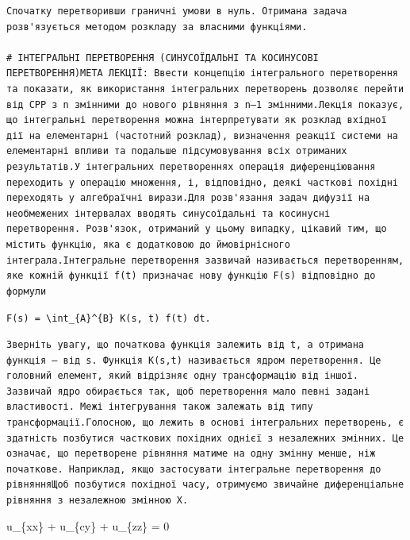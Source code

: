\documentclass[
  ukrainian,
]{article}
\begin{document}
\begin{verbatim}
Спочатку перетворивши граничні умови в нуль. Отримана задача розв'язується методом розкладу за власними функціями.

# ІНТЕГРАЛЬНІ ПЕРЕТВОРЕННЯ (СИНУСОЇДАЛЬНІ ТА КОСИНУСОВІ ПЕРЕТВОРЕННЯ)МЕТА ЛЕКЦІЇ: Ввести концепцію інтегрального перетворення та показати, як використання інтегральних перетворень дозволяє перейти від CPP з n змінними до нового рівняння з n—1 змінними.Лекція показує, що інтегральні перетворення можна інтерпретувати як розклад вхідної дії на елементарні (частотний розклад), визначення реакції системи на елементарні впливи та подальше підсумовування всіх отриманих результатів.У інтегральних перетвореннях операція диференціювання переходить у операцію множення, і, відповідно, деякі часткові похідні переходять у алгебраїчні вирази.Для розв'язання задач дифузії на необмежених інтервалах вводять синусоїдальні та косинусні перетворення. Розв'язок, отриманий у цьому випадку, цікавий тим, що містить функцію, яка є додатковою до ймовірнісного інтеграла.Інтегральне перетворення зазвичай називається перетворенням, яке кожній функції f(t) призначає нову функцію F(s) відповідно до формули
\end{verbatim}

\texttt{F(s)\ =\ \textbackslash{}int\_\{A\}\^{}\{B\}\ K(s,\ t)\ f(t)\ dt.}

\begin{verbatim}
Зверніть увагу, що початкова функція залежить від t, а отримана функція — від s. Функція K(s,t) називається ядром перетворення. Це головний елемент, який відрізняє одну трансформацію від іншої. Зазвичай ядро обирається так, щоб перетворення мало певні задані властивості. Межі інтегрування також залежать від типу трансформації.Голосною, що лежить в основі інтегральних перетворень, є здатність позбутися часткових похідних однієї з незалежних змінних. Це означає, що перетворене рівняння матиме на одну змінну менше, ніж початкове. Наприклад, якщо застосувати інтегральне перетворення до рівнянняЩоб позбутися похідної часу, отримуємо звичайне диференціальне рівняння з незалежною змінною X.
\end{verbatim}

u\_\{xx\} + u\_\{cy\} + u\_\{zz\} = 0
\end{document}
